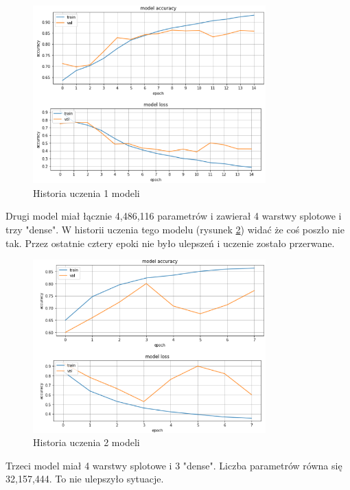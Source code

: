 \documentclass{article}
\begin{document}
\begin{figure}[H]
	\centering
	\includegraphics[width=0.8\textwidth,keepaspectratio=true]{history_1}
	\caption{Historia uczenia 1 modeli}
	\label{history_1}
\end{figure}

Drugi model miał łącznie 4,486,116 parametrów i zawierał 4 warstwy splotowe i trzy "dense". W historii uczenia tego modelu (rysunek \ref{history_2}) widać że coś poszło nie tak. Przez ostatnie cztery epoki nie było ulepszeń i uczenie zostało przerwane.

\begin{figure}[H]
	\centering
	\includegraphics[width=0.8\textwidth,keepaspectratio=true]{history_2}
	\caption{Historia uczenia 2 modeli}
	\label{history_2}
\end{figure}

Trzeci model miał 4 warstwy splotowe i 3 "dense". Liczba parametrów równa się 32,157,444. To nie ulepszyło sytuacje.
\end{document}
